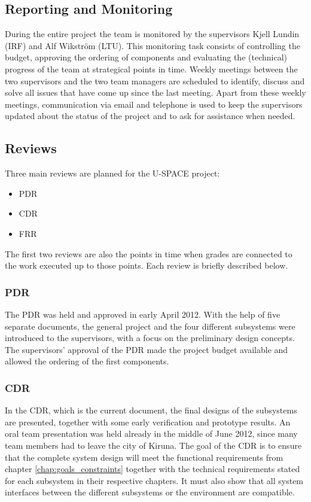 \subsection{Reporting and Monitoring}
%
During the entire project the team is monitored by the supervisors Kjell Lundin (\ac{IRF}) and Alf Wikström (\ac{LTU}). This monitoring task consists of controlling the budget, approving the ordering of components and evaluating the (technical) progress of the team at strategical points in time. Weekly meetings between the two supervisors and the two team managers are scheduled to identify, discuss and solve all issues that have come up since the last meeting. Apart from these weekly meetings, communication via email and telephone is used to keep the supervisors updated about the status of the project and to ask for assistance when needed.
%
\subsection{Reviews}
\label{subsec:reviews}
%
Three main reviews are planned for the \ac{U-SPACE} project:
%
\begin{itemize}
\item \acl{PDR}
\item \acl{CDR}
\item \acl{FRR}
\end{itemize}
%
The first two reviews are also the points in time when grades are connected to the work executed up to those points. Each review is briefly described below.
%
\subsubsection*{\acl{PDR}}

The \ac{PDR} was held and approved in early April 2012. With the help of five separate documents, the general project and the four different subsystems were introduced to the supervisors, with a focus on the preliminary design concepts. The supervisors' approval of the \ac{PDR} made the project budget available and allowed the ordering of the first components.
%
\subsubsection*{\acl{CDR}}

In the \ac{CDR}, which is the current document, the final designs of the subsystems are presented, together with some early verification and prototype results. An oral team presentation was held already in the middle of June 2012, since many team members had to leave the city of Kiruna. The goal of the \ac{CDR} is to ensure that the complete system design will meet the functional requirements from chapter \ref{chap:goals_constraints} together with the technical requirements stated for each subsystem in their respective chapters. It must also show that all system interfaces between the different subsystems or the environment are compatible.
%
